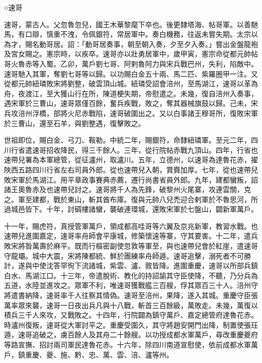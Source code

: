 
\begin{pinyinscope}

 ○速哥



 速哥，蒙古人。父忽魯忽兒，國王木華黎麾下卒也。後更隸塔海、帖哥軍。以善馳馬，有口辯，慎重不洩，令佩銀符，常居軍中。奏白機務，往返未嘗失期。太宗以為才，賜名動哥居。詔：「動哥居奏事，朝至朝入奏，夕至夕入奏。」嘗出金盤龍袍及宮女賜之。憲宗時，以疾卒。速哥亦以壯勇居軍中，歲甲寅，憲宗命從都元帥帖哥火魯赤等入蜀。乙卯，萬戶劉七哥、阿剌魯阿力與宋兵戰巴州，失利，陷敵中。速哥馳入其軍，奪劉七哥等以歸。以功賜白金五十兩、馬二匹、紫羅圈甲一注。又從都元帥紐璘敗宋將劉整，破雲頂山城。紐璘受詔會涪州，至馬湖江，速哥以革為舟，夜渡江，至大獲山行在所，陳道梗失期，帝慰遣之。未幾，復自涪州入奏事，遇宋軍於三曹山，速哥眾僅百餘，奮兵疾戰，敗之，奪其器械旗鼓以歸。己未，宋兵攻涪州浮橋，部將火尼赤戰陷，速哥破圍出之。又以白事諸王穆哥所，復敗宋軍於三曹山，還至石羊，與劉整遇，復擊敗之。



 世祖即位，賜白金、弓刀、鞍勒。中統二年，賜銀符，命隸紐璘軍。至元二年，四川行省遣速哥招收降民，得三千餘人。三年，從行院帖赤戰九頂山。四年，行省也速帶兒署為本軍總管，從征瀘州，取瀘川。五年，立德州，以速哥為達魯花赤，擢陜西五路四川行省左右司員外郎。從也速帶兒入朝，賞賚加厚。七年，從也速帶兒敗宋軍於馬湖江。用平章政事賽典赤薦，遷行尚書省員外郎。九年，建都蠻叛，詔諸王奧魯赤及也速帶兒討之。速哥將千人為先鋒，破黎州火尾寨，攻連雲關，克之。軍至建都，戰於東山，斬其酋布庫。復與元帥八兒禿迎合剌軍於不魯思河，所過城邑皆下。十年，討碉樓諸蠻，襲破連環城，還敗宋軍於七盤山，闢新軍萬戶。



 十一年，賜虎符，真授管軍萬戶，領成都高哇哥等六翼及京兆新軍，教習水戰。也速帶兒進圍嘉定，速哥率舟師會平康城，修築懷遠等寨，守其要害。十二年，遣兵敗宋將昝萬壽於麻平。既而行樞密副使忽敦等軍至，與也速帶兒會於紅崖，遣速哥守龍壩。城中大震，宋將陳都統、鮮於團練率舟師遁。速哥追擊，溺死者不可勝計，遂與中使沈答罕徇下流諸城，紫雲、瀘、敘皆降。進圍重慶，速哥以所部兵鎮白水、馬湖江口。十三年，帝遣脫術、教化的持詔諭其守臣使降，不聽，乃分兵為五道，水陸並進攻之。眾軍不利，唯速哥獲戰艦三百艘，俘其眾百三十人。涪州守將遣書納降，速哥率千人往察其情偽。速哥至涪州，果降，遂入其城。重慶守臣張萬率眾來襲，速哥一日夜出兵凡與十八戰，斬首三百餘級，萬敗走。未幾，萬復以積兵三千人來攻，又戰敗之。十四年，行院闢為鎮守萬戶、嘉定總管府達魯花赤。時瀘州復叛，速哥從大軍討平之。重慶受圍久，其守將趙安開門出降，制置使張玨遁，速哥追破之，虜百餘人及其舟二十餘艘。以功授成都水軍萬戶，尋改重慶夔府等路宣撫、招討兩司軍民達魯花赤。十六年，除四川南道宣慰使，依前成都水軍萬戶，鎮重慶、夔、施、黔、忠、萬、雲、涪、瀘等州。




\end{pinyinscope}
